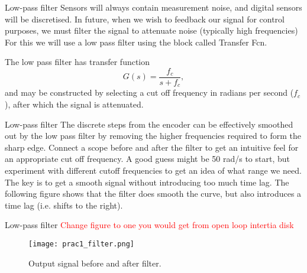 \documentclass[9pt]{beamer-control}
\begin{document}

\begin{frame}{Low-pass filter}
Sensors will always contain measurement noise, and digital sensors will be discretised. In future, when we wish to feedback our signal for control purposes, we must filter the signal to attenuate noise (typically high frequencies) For this we will use a low pass filter using the block called Transfer Fcn. 

The low pass filter has transfer function
\[
G(s) = \frac{f_c}{s+f_c},
\]
and may be constructed by selecting a cut off frequency in radians per second ($f_c$), after which the signal is attenuated.

\end{frame}


\begin{frame}{Low-pass filter}
The discrete steps from the encoder can be effectively smoothed out by the low pass filter by removing the higher frequencies required to form the sharp edge. Connect a scope before and after the filter to get an intuitive feel for an appropriate cut off frequency. A good guess might be 50 rad/s to start, but experiment with different cutoff frequencies to get an idea of what range we need. The key is to get a smooth signal without introducing too much time lag. The following figure shows that the filter does smooth the curve, but also introduces a time lag (i.e. shifts to the right).
\end{frame}

\begin{frame}{Low-pass filter}
\textcolor{red}{Change figure to one you would get from open loop intertia disk}
\begin{figure}
	\centering
	\texttt{[image: prac1\_filter.png]}
	\caption{Output signal before and after filter.}
\end{figure}
\end{frame}
\end{document}
